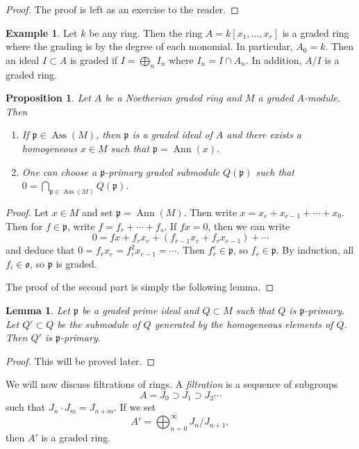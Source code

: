 \documentclass[leqno, openany]{memoir}
\newtheorem{prop}[thm]{Proposition}
\newtheorem{lem}[thm]{Lemma}
\theoremstyle{definition}
\newtheorem{exm}[thm]{Example}
\theoremstyle{remark}
\theoremstyle{plain}
\theoremstyle{definition}
\theoremstyle{remark}
\newcommand{\mf}[1]{\mathfrak{#1}}
\DeclareMathOperator{\Ann}{Ann}
\DeclareMathOperator{\Ass}{Ass}
\begin{document}
\begin{proof}
    The proof is left as an exercise to the reader.
\end{proof}

\begin{exm}
    Let $k$ be any ring. Then the ring $A = k[x_1, \ldots, x_r]$ is a graded ring where the grading is by the degree of each monomial. In particular, $A_0 = k$. Then an ideal $I \subset A$ is graded if $I = \bigoplus_n I_n$ where $I_n = I \cap A_n$. In addition, $A/I$ is a graded ring.
\end{exm}

\begin{prop}
    Let $A$ be a Noetherian graded ring and $M$ a graded $A$-module. Then
    \begin{enumerate}
        \item If $\mf{p} \in \Ass(M)$, then $\mf{p}$ is a graded ideal of $A$ and there exists a homogeneous $x \in M$ such that $\mf{p} = \Ann(x)$.
        \item One can choose a $\mf{p}$-primary graded submodule $Q(\mf{p})$ such that $0 = \bigcap_{\mf{p} \in \Ass(M)} Q(\mf{p})$.
    \end{enumerate}
\end{prop}

\begin{proof}
    Let $x \in M$ and set $\mf{p} = \Ann(M)$. Then write $x = x_e + x_{e-1} + \cdots + x_0$. Then for $f \in \mf{p}$, write $f = f_r + \cdots + f_s$. If $fx = 0$, then we can write
    \[ 0 = fx + f_r x_e + (f_{r-1} x_e + f_r x_{e-1}) + \cdots \]
    and deduce that $0 = f_r x_e = f_r^2 x_{e-1} = \cdots$. Then $f_r^e \in \mf{p}$, so $f_r \in \mf{p}$. By induction, all $f_i \in \mf{o}$, so $\mf{p}$ is graded.

    The proof of the second part is simply the following lemma.
\end{proof}

\begin{lem}
    Let $\mf{p}$ be a graded prime ideal and $Q \subset M$ such that $Q$ is $\mf{p}$-primary. Let $Q' \subset Q$ be the submodule of $Q$ generated by the homogeneous elements of $Q$. Then $Q'$ is $\mf{p}$-primary.
\end{lem}

\begin{proof}
    This will be proved later.
\end{proof}

We will now discuss filtrations of rings. A \textit{filtration} is a sequence of subgroups
\[ A = J_0 \supset J_1 \supset J_2 \cdots \]
such that $J_n \cdot J_m = J_{n+m}$. If we set
\[ A' = \bigoplus_{n=0}^{\infty} J_n / J_{n+1}, \]
then $A'$ is a graded ring.
\end{document}
